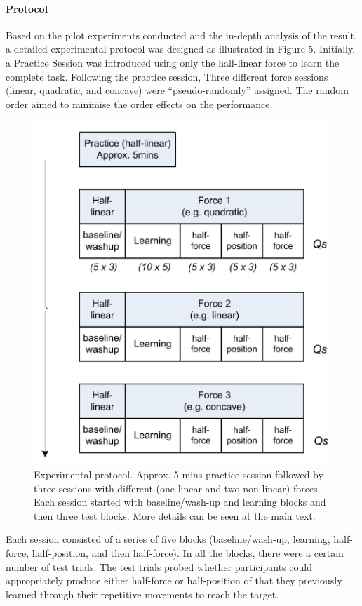 \paragraph{Protocol}
Based on the pilot experiments conducted and the in-depth analysis of the result, a detailed experimental protocol was designed as illustrated in Figure 5. Initially, a Practice Session was introduced using only the half-linear force to learn the complete task. Following the practice session, Three different force sessions (linear, quadratic, and concave) were “pseudo-randomly” assigned. The random order aimed to minimise the order effects on the performance.
\begin{figure}
  \centering
  \includegraphics[scale=0.5]{Chie/figs/Figure5.png}
  \caption{Experimental protocol. Approx. 5 mins practice session followed by three sessions with different (one linear and two non-linear) forces. Each session started with baseline/wash-up and learning blocks and then three test blocks. More details can be seen at the main text.}
  \label{protocol}
\end{figure}
Each session consisted of a series of five blocks (baseline/wash-up, learning, half-force, half-position, and then half-force). In all the blocks, there were a certain number of test trials. The test trials probed whether participants could appropriately produce either half-force or half-position of that they previously learned through their repetitive movements to reach the target.

